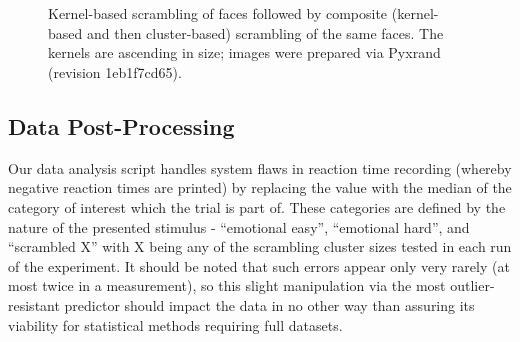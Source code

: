 		\begin{figure}
		    \begin{subfigure}[b]{0.495\textwidth}
			\centering{}
			\label{fig:m_vs_pe_1_a}
		    \end{subfigure}
		    ~%
		    \begin{subfigure}[b]{0.495\textwidth}
			\centering{}
			\label{fig:m_vs_pe_1_b}
		    \end{subfigure}
		    
		    \vspace{0.5cm}%
		    \begin{subfigure}[b]{0.495\textwidth}
			\centering{}
			\label{fig:m_vs_pe_1_c}
		    \end{subfigure}
		    ~%
		    \begin{subfigure}[b]{0.495\textwidth}
			\centering{}
			\label{fig:m_vs_pe_1_d}
		    \end{subfigure}
		    \caption{Kernel-based scrambling of faces followed by composite (kernel-based and then cluster-based) scrambling of the same faces. 
		    The kernels are ascending in size; images were prepared via Pyxrand\citep{pyxrand} (revision \textcolor{lg}{1eb1f7cd65}).}
		    \label{fig:m_vs_pe_1}
		\end{figure}
	\subsection{Data Post-Processing}
	    Our data analysis script handles system flaws in reaction time recording (whereby negative reaction times are printed) by replacing the value with the median of the category of interest which the trial is part of.
	    These categories are defined by the nature of the presented stimulus - “emotional easy”, “emotional hard”, and “scrambled X” with X being any of the scrambling cluster sizes tested in each run of the experiment.
	    It should be noted that such errors appear only very rarely (at most twice in a measurement), so this slight manipulation via the most outlier-resistant predictor should impact the data in no other way than assuring its viability for statistical methods requiring full datasets.  
